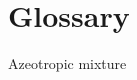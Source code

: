 
\chapter{Glossary} %

\label{AppendixA} %

\begin{description}
\item[Azeotropic mixture]
\end{description}
